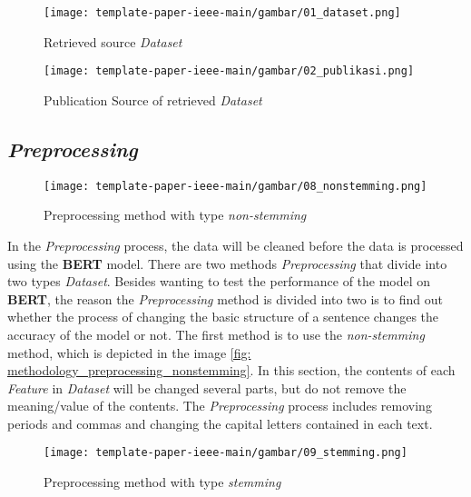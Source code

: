 \begin{figure}[h!]
  \begin{center}
    \texttt{[image: template-paper-ieee-main/gambar/01\_dataset.png]}
    \caption{Retrieved source \textit{Dataset}}
    \label{fig: dataset}
  \end{center}
\end{figure}

\begin{figure}[h!]
  \begin{center}
    \texttt{[image: template-paper-ieee-main/gambar/02\_publikasi.png]}
    \caption{Publication Source of retrieved \textit{Dataset}}
    \label{fig: publikasi}
  \end{center}
\end{figure}

\subsection{\textit{Preprocessing}}

\begin{figure}[]
  \begin{center}
    \texttt{[image: template-paper-ieee-main/gambar/08\_nonstemming.png]}
    \caption{Preprocessing method with type \textit{non-stemming}}
    \label{fig: metodologi_preprocessing_nonstemming}
  \end{center}
\end{figure}

In the \textit{Preprocessing} process, the data will be cleaned before the data is processed using the \textbf{BERT} model. There are two methods \textit{Preprocessing} that divide into two types \textit{Dataset}. Besides wanting to test the performance of the model on \textbf{BERT}, the reason the \textit{Preprocessing} method is divided into two is to find out whether the process of changing the basic structure of a sentence changes the accuracy of the model or not. The first method is to use the \textit{non-stemming} method, which is depicted in the image \ref{fig: methodology_preprocessing_nonstemming}. In this section, the contents of each \textit{Feature} in \textit{Dataset} will be changed several parts, but do not remove the meaning/value of the contents. The \textit{Preprocessing} process includes removing periods and commas and changing the capital letters contained in each text.

\begin{figure}[]
  \begin{center}
    \texttt{[image: template-paper-ieee-main/gambar/09\_stemming.png]}
    \caption{Preprocessing method with type \textit{stemming}}
    \label{fig: metodologi_preprocessing_stemming}
  \end{center}
\end{figure}

